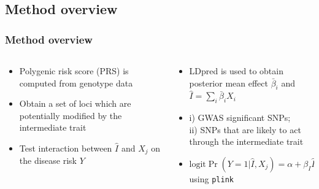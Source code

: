 \documentclass{beamer}
\newcommand\logit{\text{logit}}
\begin{document}
  \subsection{Method overview}
  \begin{frame}
  \frametitle{Method overview}
    \begin{columns}
      \begin{column}{.44\textwidth}
        \begin{itemize}
          \item Polygenic risk score (PRS) is computed from genotype data
          \item Obtain a set of loci which are potentially modified by the intermediate trait
          \item Test interaction between $\hat{I}$ and $X_j$ on the disease risk $Y$
        \end{itemize}
      \end{column}
      \begin{column}{.54\textwidth}
        \begin{itemize}
          \item LDpred \cite{vilhjalmsson2015modeling} is used to obtain posterior mean effect $\bar{\beta}_i$ and $\hat{I} = \sum_i \bar{\beta}_i X_i$
          \item i) GWAS significant SNPs; \\
                ii) SNPs that are likely to act through the intermediate trait
          \item $\logit{\Pr(Y = 1|\hat{I}, X_j)} = \alpha + \beta_I \hat{I} + \beta_j X_j + \gamma \hat{I} X_j$ using \texttt{plink}
        \end{itemize}
      \end{column}
    \end{columns}
  \end{frame}
\end{document}
